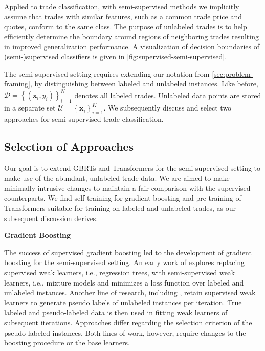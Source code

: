 Applied to trade classification, with semi-supervised methods we implicitly assume that trades with similar features, such as a common trade price and quotes, conform to the same class. The purpose of unlabeled trades is to help efficiently determine the boundary around regions of neighboring trades resulting in improved generalization performance. A visualization of decision boundaries of (semi-)supervised classifiers is given in \cref{fig:supervised-semi-supervised}.

The semi-supervised setting requires extending our notation from \cref{sec:problem-framing}, by distinguishing between labeled and unlabeled instances. Like before, $\mathcal{D}=\left\{\left(\mathbf{x}_i, y_i\right)\right\}_{i=1}^N$ denotes all labeled trades. Unlabeled data points are stored in a separate set $\mathcal{U} = \left\{\mathbf{x}_i\right\}_{i=1}^{K}$. We subsequently discuss and select two approaches for semi-supervised trade classification.

\subsection{Selection of Approaches}\label{sec:selection-of-approaches-1}

Our goal is to extend \glspl{GBRT} and Transformers for the semi-supervised setting to make use of the abundant, unlabeled trade data. We are aimed to make minimally intrusive changes to maintain a fair comparison with the supervised counterparts. We find self-training for gradient boosting and pre-training of Transformers suitable for training on labeled and unlabeled trades, as our subsequent discussion derives.

\textbf{Gradient Boosting}

The success of supervised gradient boosting led to the development of gradient boosting for the semi-supervised setting. An early work of \textcite[][555--556]{dalche-bucSemisupervisedMarginBoost2001} explores replacing supervised weak learners, i.e., regression trees, with semi-supervised weak learners, i.e., mixture models and minimizes a loss function over labeled and unlabeled instances. Another line of research, including \textcites[][290--291]{bennettExploitingUnlabeledData2002}[][2003--2004]{mallapragadaSemiBoostBoostingSemiSupervised2009}, retain supervised weak learners to generate pseudo labels of unlabeled instances per iteration. True labeled and pseudo-labeled data is then used in fitting weak learners of subsequent iterations. Approaches differ regarding the selection criterion of the pseudo-labeled instances. Both lines of work, however, require changes to the boosting procedure or the base learners.

